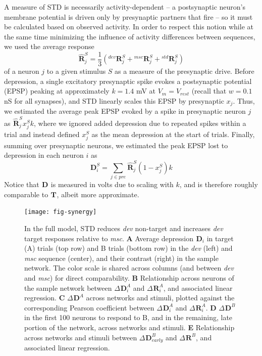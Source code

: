 \documentclass[9pt,lineno,onehalfspacing]{elife}
\newcommand{\dev}{\textit{dev}}
\newcommand{\msc}{\textit{msc}}
\newcommand{\R}[3][]{{}^{#1}_{}\boldsymbol R^{#2}_{#3}}
\newcommand{\T}[3][]{{}^{#1}_{}\boldsymbol T^{#2}_{#3}}
\newcommand{\D}[3][]{{}^{#1}_{}\boldsymbol D^{#2}_{#3}}
\newcommand{\Rhat}[3][]{{}^{#1}_{}\widehat{\boldsymbol R}^{#2}_{#3}}
\begin{document}
A measure of STD is necessarily activity-dependent -- a postsynaptic neuron's membrane potential is driven only by presynaptic partners that fire -- so it must be calculated based on observed activity. In order to respect this notion while at the same time minimizing the influence of activity differences between sequences, we used the average response
\begin{equation}
    \Rhat{S}{j} = \frac{1}{3} (\R[dev]{S}{j} + \R[msc]{S}{j} + \R[std]{S}{j}) \label{eq:Rhat}
\end{equation}
of a neuron $j$ to a given stimulus $S$ as a measure of the presynaptic drive. Before depression, a single excitatory presynaptic spike evokes a postsynaptic potential (EPSP) peaking at approximately $k = 1.4$ mV at $V_m = V_{rest}$ (recall that $w = 0.1$ nS for all synapses), and STD linearly scales this EPSP by presynaptic $x_j$. Thus, we estimated the average peak EPSP evoked by a spike in presynaptic neuron $j$ as $\Rhat{S}{j} x_j^S k$, where we ignored added depression due to repeated spikes within a trial and instead defined $x_j^S$ as the mean depression at the start of trials. Finally, summing over presynaptic neurons, we estimated the peak EPSP lost to depression in each neuron $i$ as
\begin{equation}
    \D{S}{i} = \sum_{j \in pre} \Rhat{S}{j} (1-x_j^S) k \label{eq:D}
\end{equation}
Notice that $\D{}{}$ is measured in volts due to scaling with $k$, and is therefore roughly comparable to $\T{}{}$, albeit more approximate.

\begin{figure}
    \texttt{[image: fig-synergy]}
    \caption{%
        In the full model, STD reduces \dev{} non-target and increases \dev{} target responses relative to \msc{}.
        \textbf{A} Average depression $\D{}{i}$ in target (A) trials (top row) and B trials (bottom row) in the \dev{} (left) and \msc{} sequence (center), and their contrast (right) in the sample network. The color scale is shared across columns (and between \dev{} and \msc{}) for direct comparability.
        \textbf{B} Relationship across neurons of the sample network between $\Delta \D{A}{i}$ and $\Delta \R{A}{i}$, and associated linear regression.
        \textbf{C} $\Delta \D{A}{}$ across networks and stimuli, plotted against the corresponding Pearson coefficient between $\Delta \D{A}{i}$ and $\Delta \R{A}{i}$.
        \textbf{D} $\Delta \D{B}{}$ in the first 100 neurons to respond to B, and in the remaining, late portion of the network, across networks and stimuli.
        \textbf{E} Relationship across networks and stimuli between $\Delta \D{B}{early}$ and $\Delta \R{B}{}$, and associated linear regression.
    }
    \label{fig:synergy}
\end{figure}
\end{document}
